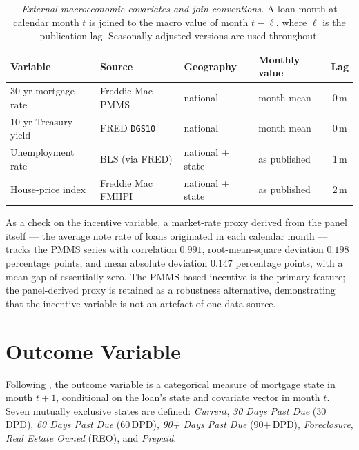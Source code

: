 \begin{table}[htbp]
  \centering
  \small
  \begin{tabularx}{\textwidth}{@{} l l l l c @{}}
    \toprule
    \textbf{Variable} & \textbf{Source} & \textbf{Geography}
      & \textbf{Monthly value} & \textbf{Lag} \\
    \midrule
    30-yr mortgage rate & Freddie Mac PMMS & national & month mean & 0\,m \\
    10-yr Treasury yield & FRED \texttt{DGS10} & national & month mean & 0\,m \\
    Unemployment rate & BLS (via FRED) & national + state & as published & 1\,m \\
    House-price index & Freddie Mac FMHPI & national + state & as published & 2\,m \\
    \bottomrule
  \end{tabularx}
  \caption[External macroeconomic covariates and join conventions]%
  {\textit{External macroeconomic covariates and join conventions.}
  A loan-month at calendar month $t$ is joined to the macro value of
  month $t-\ell$, where $\ell$ is the publication lag.  Seasonally
  adjusted versions are used throughout.}
  \label{tab:macrovars}
\end{table}

As a check on the incentive variable, a market-rate proxy derived
from the panel itself --- the average note rate of loans originated
in each calendar month --- tracks the PMMS series with correlation
$0.991$, root-mean-square deviation $0.198$ percentage points, and
mean absolute deviation $0.147$ percentage points, with a mean gap of
essentially zero.  The PMMS-based incentive is the primary feature;
the panel-derived proxy is retained as a robustness alternative,
demonstrating that the incentive variable is not an artefact of one
data source.

\section{Outcome Variable}
\label{sec:data-outcome}

Following \citet{sirignano2021}, the outcome variable is a categorical
measure of mortgage state in month $t+1$, conditional on the loan's
state and covariate vector in month $t$.  Seven mutually exclusive
states are defined: \emph{Current}, \emph{30 Days Past Due}
(30\,DPD), \emph{60 Days Past Due} (60\,DPD), \emph{90+ Days Past
Due} (90+\,DPD), \emph{Foreclosure}, \emph{Real Estate Owned} (REO),
and \emph{Prepaid}.

